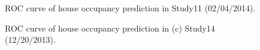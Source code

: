 \begin{figure}[h]
	\caption{
	ROC curve of house occupancy prediction in Study11 (02/04/2014).
}
	\label{fig_rocresults_2}
\end{figure}

\begin{figure}[h]
	\caption{
	ROC curve of house occupancy prediction in (c) Study14 (12/20/2013).
}
	\label{fig_rocresults_3}
\end{figure}









